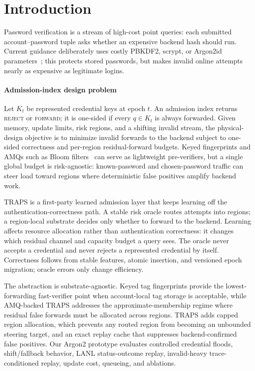 \section{Introduction}

Password verification is a stream of high-cost point queries: each submitted account--password tuple asks whether an expensive backend hash should run. Current guidance deliberately uses costly PBKDF2, scrypt, or Argon2id parameters~\cite{nist_sp800_63b_4_2025}; this protects stored passwords, but makes invalid online attempts nearly as expensive as legitimate logins.

\paragraph{Admission-index design problem}
Let \(K_t\) be represented credential keys at epoch \(t\). An admission index returns \textsc{reject} or \textsc{forward}; it is one-sided if every \(q\in K_t\) is always forwarded. Given memory, update limits, risk regions, and a shifting invalid stream, the physical-design objective is to minimize invalid forwards to the backend subject to one-sided correctness and per-region residual-forward budgets. Keyed fingerprints and AMQs such as Bloom filters~\cite{broder2004network} can serve as lightweight pre-verifiers, but a single global budget is risk-agnostic: known-password and chosen-password traffic can steer load toward regions where deterministic false positives amplify backend work.

TRAPS is a first-party learned admission layer that keeps learning off the authentication-correctness path. A stable risk oracle routes attempts into regions; a region-local substrate decides only whether to forward to the backend. Learning affects resource allocation rather than authentication correctness: it changes which residual channel and capacity budget a query sees. The oracle never accepts a credential and never rejects a represented credential by itself. Correctness follows from stable features, atomic insertion, and versioned epoch migration; oracle errors only change efficiency.

The abstraction is substrate-agnostic. Keyed tag fingerprints provide the lowest-forwarding fast-verifier point when account-local tag storage is acceptable, while AMQ-backed TRAPS addresses the approximate-membership regime where residual false forwards must be allocated across regions. TRAPS adds capped region allocation, which prevents any routed region from becoming an unbounded steering target, and an exact replay cache that suppresses backend-confirmed false positives. Our Argon2 prototype evaluates controlled credential floods, shift/fallback behavior, LANL status-outcome replay, invalid-heavy trace-conditioned replay, update cost, queueing, and ablations.

